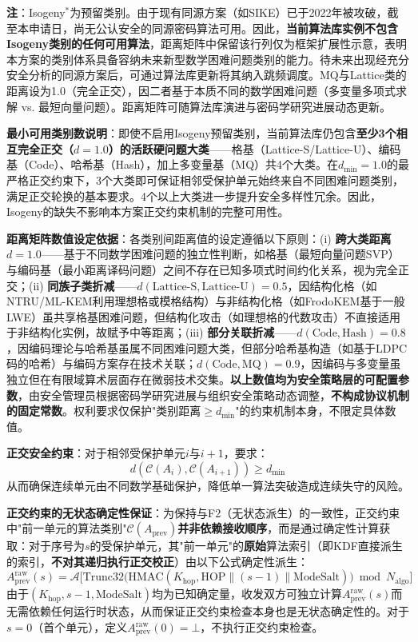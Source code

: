 ﻿\documentclass[12pt,a4paper]{article}
\begin{document}
\textbf{注}：Isogeny$^*$为预留类别。由于现有同源方案（如SIKE）已于2022年被攻破，截至本申请日，尚无公认安全的同源密码算法可用。因此，\textbf{当前算法库实例不包含Isogeny类别的任何可用算法}，距离矩阵中保留该行列仅为框架扩展性示意，表明本方案的类别体系具备容纳未来新型数学困难问题类别的能力。待未来出现经充分安全分析的同源方案后，可通过算法库更新将其纳入跳频调度。MQ与Lattice类的距离设为1.0（完全正交），因二者基于本质不同的数学困难问题（多变量多项式求解 vs. 最短向量问题）。距离矩阵可随算法库演进与密码学研究进展动态更新。

\textbf{最小可用类别数说明}：即使不启用Isogeny预留类别，当前算法库仍包含\textbf{至少3个相互完全正交（$d=1.0$）的活跃硬问题大类}——格基（Lattice-S/Lattice-U）、编码基（Code）、哈希基（Hash），加上多变量基（MQ）共4个大类。在$d_{\min}=1.0$的最严格正交约束下，3个大类即可保证相邻受保护单元始终来自不同困难问题类别，满足正交轮换的基本要求。4个以上大类进一步提升安全多样性冗余。因此，Isogeny的缺失不影响本方案正交约束机制的完整可用性。

\textbf{距离矩阵数值设定依据}：各类别间距离值的设定遵循以下原则：(i) \textbf{跨大类距离$d=1.0$}——基于不同数学困难问题的独立性判断，如格基（最短向量问题SVP）与编码基（最小距离译码问题）之间不存在已知多项式时间约化关系，视为完全正交；(ii) \textbf{同族子类折减}——$d(\text{Lattice-S}, \text{Lattice-U})=0.5$，因结构化格（如NTRU/ML-KEM利用理想格或模格结构）与非结构化格（如FrodoKEM基于一般LWE）虽共享格基困难问题，但结构化攻击（如理想格的代数攻击）不直接适用于非结构化实例，故赋予中等距离；(iii) \textbf{部分关联折减}——$d(\text{Code}, \text{Hash})=0.8$，因编码理论与哈希基虽属不同困难问题大类，但部分哈希基构造（如基于LDPC码的哈希）与编码方案存在技术关联；$d(\text{Code}, \text{MQ})=0.9$，因编码与多变量虽独立但在有限域算术层面存在微弱技术交集。\textbf{以上数值均为安全策略层的可配置参数}，由安全管理员根据密码学研究进展与组织安全策略动态调整，\textbf{不构成协议机制的固定常数}。权利要求仅保护"类别距离$\geq d_{\min}$"的约束机制本身，不限定具体数值。

\textbf{正交安全约束}：对于相邻受保护单元$i$与$i+1$，要求：
\begin{equation}\label{eq:constraint}
    d(\mathcal{C}(A_i), \mathcal{C}(A_{i+1})) \geq d_{\min}
\end{equation}
从而确保连续单元由不同数学基础保护，降低单一算法突破造成连续失守的风险。

\textbf{正交约束的无状态确定性保证}：为保持与F2（无状态派生）的一致性，正交约束中"前一单元的算法类别"$\mathcal{C}(A_{\text{prev}})$\textbf{并非依赖接收顺序}，而是通过确定性计算获取：对于序号为$s$的受保护单元，其"前一单元"的\textbf{原始}算法索引（即KDF直接派生的索引，\textbf{不对其递归执行正交校正}）由以下公式确定性派生：
\begin{equation}\label{eq:prev_derive}
    A_{\text{prev}}^{\text{raw}}(s) = \mathcal{A}\bigl[\text{Trunc32}\bigl(\text{HMAC}(K_{\text{hop}}, \text{HOP} \| (s-1) \| \text{ModeSalt})\bigr) \bmod N_{\text{algo}}\bigr]
\end{equation}
由于$(K_{\text{hop}}, s-1, \text{ModeSalt})$均为已知确定量，收发双方可独立计算$A_{\text{prev}}^{\text{raw}}(s)$而无需依赖任何运行时状态，从而保证正交约束检查本身也是无状态确定性的。对于$s=0$（首个单元），定义$A_{\text{prev}}^{\text{raw}}(0) = \bot$，不执行正交约束检查。
\end{document}
